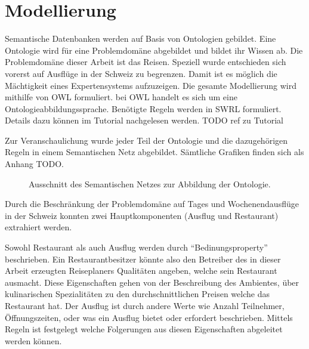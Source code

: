 \section{Modellierung}
\label{sec:loesung_modellierung}

Semantische Datenbanken werden auf Basis von Ontologien gebildet. Eine Ontologie wird für eine Problemdomäne abgebildet und bildet ihr Wissen ab. Die Problemdomäne dieser Arbeit ist das Reisen. Speziell wurde entschieden sich vorerst auf Ausflüge in der Schweiz zu begrenzen. Damit ist es möglich die Mächtigkeit eines Expertensystems aufzuzeigen. Die gesamte Modellierung wird mithilfe von OWL formuliert. bei OWL handelt es sich um eine Ontologieabbildungssprache. Benötigte Regeln werden in SWRL formuliert. Details dazu können im Tutorial nachgelesen werden. TODO ref zu Tutorial

Zur Veranschaulichung wurde jeder Teil der Ontologie und die dazugehörigen Regeln in einem Semantischen Netz abgebildet. Sämtliche Grafiken finden sich als Anhang TODO.  


\begin{figure}[H]
\centering {}
\caption{Ausschnitt des Semantischen Netzes zur Abbildung der Ontologie.\label{fig:semNetzLoesung}\protect\footnotemark}
\end{figure}


Durch die Beschränkung der Problemdomäne auf Tages und Wochenendausflüge in der Schweiz konnten zwei Hauptkomponenten (Ausflug und Restaurant) extrahiert werden. 

Sowohl Restaurant als auch Ausflug werden durch "`Bedinungsproperty"' beschrieben. Ein Restaurantbesitzer könnte also den  Betreiber des in dieser Arbeit erzeugten Reiseplaners Qualitäten angeben, welche sein Restaurant ausmacht. Diese Eigenschaften gehen von der Beschreibung des Ambientes, über kulinarischen Spezialitäten zu den durchschnittlichen Preisen welche das Restaurant hat. Der Ausflug ist durch andere Werte wie Anzahl Teilnehmer, Öffnungszeiten, oder was ein Ausflug bietet oder erfordert beschrieben.
Mittels Regeln ist festgelegt welche Folgerungen aus diesen Eigenschaften abgeleitet werden können.

